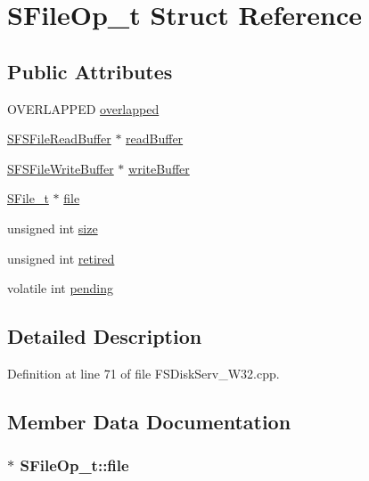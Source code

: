 \hypertarget{struct_s_file_op__t}{
\section{SFileOp\_\-t Struct Reference}
\label{struct_s_file_op__t}
}
\subsection*{Public Attributes}
\begin{CompactItemize}
\item 
OVERLAPPED \hyperlink{struct_s_file_op__t_7580e2d7725d9e62b6f01af716882b5a}{overlapped}
\item 
\hyperlink{struct_s_f_s_file_read_buffer__t}{SFSFileReadBuffer} $\ast$ \hyperlink{struct_s_file_op__t_a85b29f1d72b6b477e9e4ba93f18be1c}{readBuffer}
\item 
\hyperlink{struct_s_f_s_file_write_buffer__t}{SFSFileWriteBuffer} $\ast$ \hyperlink{struct_s_file_op__t_35a76a584a5395b66dc709e5a81a690a}{writeBuffer}
\item 
\hyperlink{struct_s_file__t}{SFile\_\-t} $\ast$ \hyperlink{struct_s_file_op__t_d11881794d5507b1eee0c41a840b7062}{file}
\item 
unsigned int \hyperlink{struct_s_file_op__t_3d23fc9294b4099d03479ecc39867c5d}{size}
\item 
unsigned int \hyperlink{struct_s_file_op__t_b7c0b908f7ae23db0ed6963eb79335e8}{retired}
\item 
volatile int \hyperlink{struct_s_file_op__t_5d5cf61968a0cb6006012635d2754544}{pending}
\end{CompactItemize}


\subsection{Detailed Description}


Definition at line 71 of file FSDiskServ\_\-W32.cpp.

\subsection{Member Data Documentation}
\hypertarget{struct_s_file_op__t_d11881794d5507b1eee0c41a840b7062}{
\subsubsection[{file}]{$\ast$ {\bf SFileOp\_\-t::file}}}
\label{struct_s_file_op__t_d11881794d5507b1eee0c41a840b7062}





